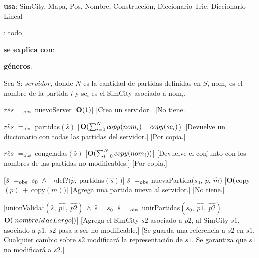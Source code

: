 \begin{Interfaz}

    \textbf{usa}: SimCity, Mapa, Pos, Nombre, Construcción, Diccionario Trie, Diccionario Lineal
    
    : todo

    \textbf{se explica con}: 

    \textbf{géneros}: 


    Sea S: $servidor$, donde $N$ es la cantidad de partidas definidas en $S$, nom$_i$ es el nombre de la partida $i$ y sc$_i$  es el SimCity asociado a nom$_i$.

    {$\hat{res}\ \igobs\ $nuevoServer}
    [$\bold{O}(1)$]
    [Crea un servidor.]
    [No tiene.]

    {$\hat{res}\ \igobs\ $partidas$(\hat{s})$}
    [$\bold{O}(\sum_{i = 0}^{N}{copy(nom_i) + copy(sc_i)}$)]
    [Devuelve un diccionario con todas las partidas del servidor.]
    [Por copia.] %

    {$\hat{res}\ \igobs\ $congeladas$(\hat{s})$}
    [$\bold{O}(\sum_{i = 0}^{N}{copy(nom_i)})$]
    [Devuelve el conjunto con los nombres de las partidas no modificables.]
    [Por copia.]

    [$\hat{s}\ \igobs\ s_0\ \wedge\ \lnot $def?$(\hat{p},\ $partidas$(\hat{s}))$]
    {$\hat{s}\ \igobs\ $nuevaPartida($s_0,\ \hat{p},\ \hat{m})$}
    [$\bold{O}($copy$(p)\ +\ $copy$(m))$]
    [Agrega una partida nueva al servidor.]
    [No tiene.]

    [unionValida$^{1}(\hat{s},\ \hat{p1},\ \hat{p2})\ \land\ \hat{s} = s_0$]
    {$\hat{s}\ \igobs\ $unirPartidas$(s_0,\ \hat{p1},\ \hat{p2})$}
    [$\bold{O}(|nombreMasLargo|)$]
    [Agrega el SimCity $s2$ asociado a $p2$, al SimCity $s1$, asociado a $p1$. $s2$ pasa a ser no modificable.]
    [Se guarda una referencia a $s2$ en $s1$. Cualquier cambio sobre $s2$ modificará la representación de $s1$. Se garantiza que $s1$ no modificará a $s2$.]


\end{Interfaz}
